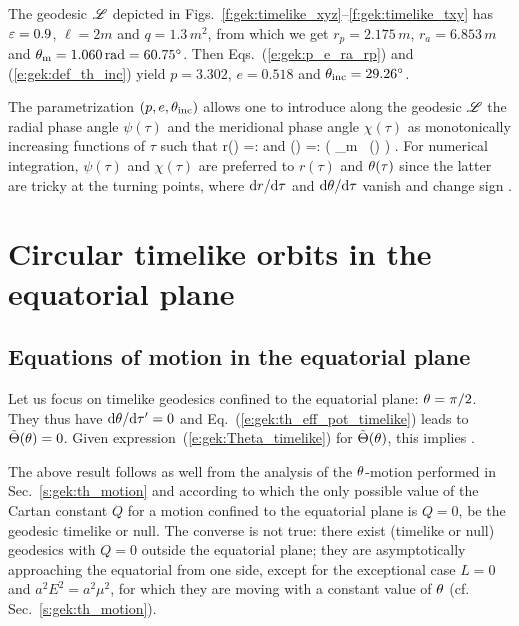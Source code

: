 \begin{example}
The geodesic $\mathscr{L}$ depicted in Figs.~\ref{f:gek:timelike_xyz}--\ref{f:gek:timelike_txy}
has $\varepsilon=0.9$, $\ell=2 m$ and $q=1.3\, m^2$, from which we get
$r_p = 2.175\, m$,
$r_a = 6.853\, m$ and $\theta_{\rm m} = 1.060\, {\rm rad} = 60.75^\circ$.
Then Eqs.~(\ref{e:gek:p_e_ra_rp}) and (\ref{e:gek:def_th_inc}) yield
$p=3.302$, $e=0.518$ and $\theta_{\rm inc} = 29.26^\circ$.
\end{example}

The parametrization $(p, e, \theta_{\rm inc})$ allows one to introduce
along the geodesic $\mathscr{L}$ the radial phase angle $\psi(\tau)$ and the
meridional phase angle $\chi(\tau)$ as monotonically increasing functions
of $\tau$ such that
\be
    r(\tau) =:  \qquad\mbox{and}\qquad
    \th(\tau) =: \arccos\left( \cos\th_{\rm m} \, \cos\chi(\tau) \right) .
\ee
For numerical integration, $\psi(\tau)$ and $\chi(\tau)$ are preferred
to $r(\tau)$ and $\theta(\tau)$ since the latter are tricky at the
turning points, where $\mathrm{d} r/\mathrm{d}\tau$ and $\mathrm{d}\theta/\mathrm{d}\tau$ vanish and change sign
\cite{DrascH04}.


\section{Circular timelike orbits in the equatorial plane} \label{s:gek:circ_equat}

\subsection{Equations of motion in the equatorial plane}

Let us focus on timelike geodesics confined to the equatorial plane:
$\theta=\pi/2$. They thus have $\mathrm{d}\theta/\mathrm{d}\tau' = 0$ and Eq.~(\ref{e:gek:th_eff_pot_timelike})
leads to $\tilde{\Theta}(\theta) = 0$. Given expression~(\ref{e:gek:Theta_timelike}) for $\tilde{\Theta}(\theta)$, this
implies
\be \label{e:gek_equat_q_zero}
    .
\ee
\begin{remark}
The above result follows as well from the analysis of the $\theta$-motion performed
in Sec.~\ref{s:gek:th_motion} and according to which the only possible value of
the Cartan constant $Q$
for a motion confined to the equatorial plane is $Q=0$, be the geodesic timelike or null.
The converse is not true: there exist (timelike or null) geodesics with $Q=0$ outside the equatorial
plane; they are asymptotically approaching the equatorial from one side, except for
the exceptional case $L=0$ and $a^2 E^2 = a^2 \mu^2$, for which they are moving with
a constant value of $\theta$ (cf. Sec.~\ref{s:gek:th_motion}).
\end{remark}

